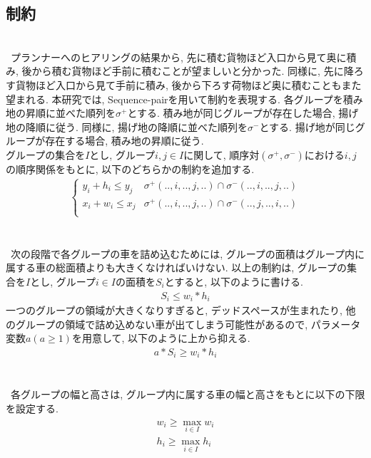 \subsection{制約}
\\
\ プランナーへのヒアリングの結果から, 先に積む貨物ほど入口から見て奥に積み, 後から積む貨物ほど手前に積むことが望ましいと分かった. 
同様に, 先に降ろす貨物ほど入口から見て手前に積み, 後から下ろす荷物ほど奥に積むこともまた望まれる. 
本研究では, Sequence-pairを用いて制約を表現する. 
各グループを積み地の昇順に並べた順列を$\sigma^+$とする. 
積み地が同じグループが存在した場合, 揚げ地の降順に従う. 
同様に, 揚げ地の降順に並べた順列を$\sigma^-$とする.
揚げ地が同じグループが存在する場合, 積み地の昇順に従う. \\
グループの集合を$I$とし, グループ$i,j \in I$に関して, 順序対$(\sigma^+,\sigma^-)$における$i,j$の順序関係をもとに, 以下のどちらかの制約を追加する. \\
\begin{eqnarray}
    \left\{
        \begin{array}{ll}
            y_i + h_i \leq y_j & \sigma^+(..,i,..,j,..) \cap \sigma^-(..,i,..,j,..) \\
            x_i + w_i \leq x_j & \sigma^+(..,i,..,j,..) \cap \sigma^-(..,j,..,i,..) \\
        \end{array}
    \right.
\end{eqnarray}\\


\\
\ 次の段階で各グループの車を詰め込むためには, グループの面積はグループ内に属する車の総面積よりも大きくなければいけない. 
以上の制約は, グループの集合を$I$とし, グループ$i \in I$の面積を$S_i$とすると, 以下のように書ける. \\
\begin{eqnarray}
    S_i \leq w_i*h_i
\end{eqnarray}
一つのグループの領域が大きくなりすぎると, デッドスペースが生まれたり, 他のグループの領域で詰め込めない車が出てしまう可能性があるので, パラメータ変数$a (a \geq 1)$を用意して, 以下のように上から抑える. 
\begin{eqnarray}
    a*S_i \geq w_i*h_i
    \label{a_const}
\end{eqnarray}\\

\\
\ 各グループの幅と高さは, グループ内に属する車の幅と高さをもとに以下の下限を設定する. \\
\begin{eqnarray}
    w_i \geq \max_{i \in I} w_i \\
    h_i \geq \max_{i \in I} h_i
\end{eqnarray}

